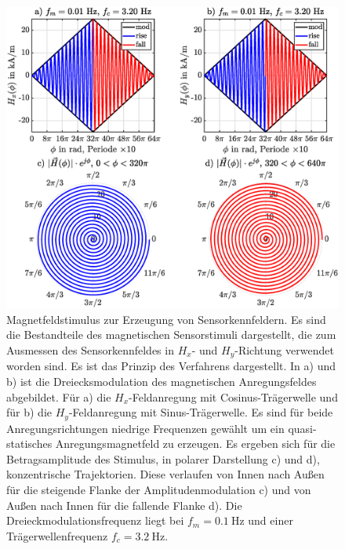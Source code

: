 	
	\clearpage
	\begin{figure}[tbph]
		\centering
		\includegraphics[width=\linewidth]{chapters/images/Magnetfeldstimulus_Kennfeldmethode}
		\caption[Magnetfeldstimulus zur Erzeugung von Sensorkennfeldern]{Magnetfeldstimulus zur Erzeugung von 
		Sensorkennfeldern. Es sind die Bestandteile des magnetischen Sensorstimuli dargestellt, die zum Ausmessen des 
		Sensorkennfeldes in $H_x$- und $H_y$-Richtung verwendet worden sind. Es ist das Prinzip des Verfahrens 
		dargestellt. In a) und b) ist die Dreiecksmodulation des magnetischen Anregungsfeldes abgebildet. Für a) die 
		$H_x$-Feldanregung mit Cosinus-Trägerwelle und für b) die $H_y$-Feldanregung mit Sinus-Trägerwelle. Es sind für 
		beide Anregungsrichtungen niedrige Frequenzen gewählt um ein quasi-statisches Anregungsmagnetfeld zu erzeugen. 
		Es ergeben sich für die Betragsamplitude des Stimulus, in polarer Darstellung c) und d), konzentrische 
		Trajektorien. Diese verlaufen von Innen nach Außen für die steigende Flanke der Amplitudenmodulation c) und von 
		Außen nach Innen für die fallende Flanke d). Die Dreieckmodulationsfrequenz liegt bei $f_m = \SI{0.1}{\hertz}$ 
		und einer Trägerwellenfrequenz $f_c = \SI{3.2}{\hertz}$.}
		\label{fig:magnetfeldstimuluskennfeldmethode}
	\end{figure}
	
